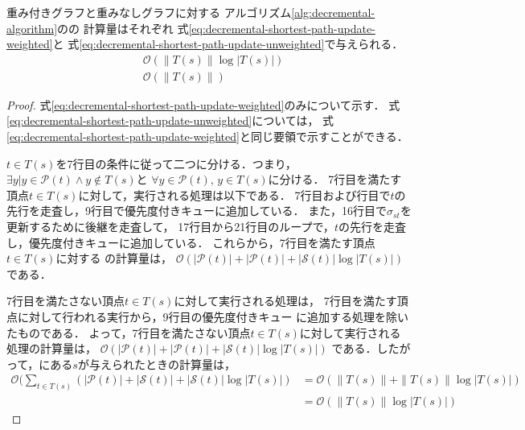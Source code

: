 \begin{theorem}
  \label{thm:decremental-shortest-path-update}
  重み付きグラフと重みなしグラフに対する
  アルゴリズム\ref{alg:decremental-algorithm}のの
  計算量はそれぞれ
  式\eqref{eq:decremental-shortest-path-update-weighted}と
  式\eqref{eq:decremental-shortest-path-update-unweighted}で与えられる．
  \begin{align}
    &\mathcal{O}\left(\|T(s)\|\log|T(s)|\right)
    \label{eq:decremental-shortest-path-update-weighted} \\
    &\mathcal{O}\left(\|T(s)\|\right)
    \label{eq:decremental-shortest-path-update-unweighted}
  \end{align}
\end{theorem}
\begin{proof}
  式\eqref{eq:decremental-shortest-path-update-weighted}のみについて示す．
  式\eqref{eq:decremental-shortest-path-update-unweighted}については，
  式\eqref{eq:decremental-shortest-path-update-weighted}と同じ要領で示すことができる．

  $t\in T(s)$を7行目の条件に従って二つに分ける．つまり，
  $\exists y|y\in\mathcal{P}(t)\land y\notin T(s)$と
  $\forall y\in\mathcal{P}(t),\,y\in T(s)$に分ける．
  7行目を満たす頂点$t\in T(s)$に対して，実行される処理は以下である．
  7行目および行目で$t$の先行を走査し，9行目で優先度付きキューに追加している．
  また，16行目で$\sigma_{st}$を更新するために後継を走査して，
  17行目から21行目のループで，$t$の先行を走査し，優先度付きキューに追加している．
  これらから，7行目を満たす頂点$t\in T(s)$に対する
  の計算量は，
  $\mathcal{O}(|\mathcal{P}(t)|+|\mathcal{P}(t)|+|\mathcal{S}(t)|\log|T(s)|)$
  である．

  7行目を満たさない頂点$t\in T(s)$に対して実行される処理は，
  7行目を満たす頂点に対して行われる実行から，9行目の優先度付きキュー
  に追加する処理を除いたものである．
  よって，7行目を満たさない頂点$t\in T(s)$に対して実行される処理の計算量は，
  $\mathcal{O}(|\mathcal{P}(t)|+|\mathcal{P}(t)|+|\mathcal{S}(t)|\log|T(s)|)$
  である．したがって，にある$s$が与えられたときの計算量は，
  \begin{equation*}
    \begin{aligned}
      \mathcal{O}(\sum_{t\in T(s)}(|\mathcal{P}(t)|+|\mathcal{S}(t)|+|\mathcal{S}(t)|\log|T(s)|)
      &=\mathcal{O}(\|T(s)\|+\|T(s)\|\log|T(s)|) \\
      &=\mathcal{O}(\|T(s)\|\log|T(s)|)
    \end{aligned}
  \end{equation*}
\end{proof}

